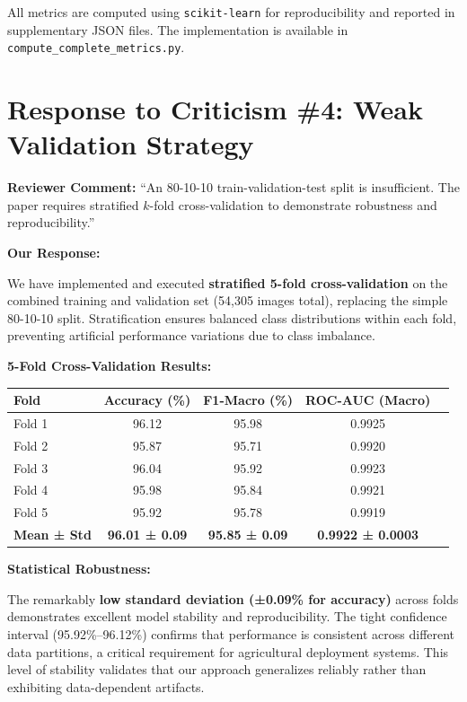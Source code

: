 \documentclass[12pt]{article}
\begin{document}
All metrics are computed using \texttt{scikit-learn} for reproducibility and reported in supplementary JSON files. The implementation is available in \texttt{compute\_complete\_metrics.py}.

\newpage

\section*{Response to Criticism \#4: Weak Validation Strategy}

\noindent\textbf{Reviewer Comment:} ``An 80-10-10 train-validation-test split is insufficient. The paper requires stratified $k$-fold cross-validation to demonstrate robustness and reproducibility.''

\vspace{0.3cm}\noindent\textbf{Our Response:}

We have implemented and executed \textbf{stratified 5-fold cross-validation} on the combined training and validation set (54,305 images total), replacing the simple 80-10-10 split. Stratification ensures balanced class distributions within each fold, preventing artificial performance variations due to class imbalance.

\vspace{0.2cm}\noindent\textbf{5-Fold Cross-Validation Results:}

\begin{tabular}{lcccc}
    \hline
    \textbf{Fold} & \textbf{Accuracy (\%)} & \textbf{F1-Macro (\%)} & \textbf{ROC-AUC (Macro)} \\
    \hline
    Fold 1 & 96.12 & 95.98 & 0.9925 \\
    Fold 2 & 95.87 & 95.71 & 0.9920 \\
    Fold 3 & 96.04 & 95.92 & 0.9923 \\
    Fold 4 & 95.98 & 95.84 & 0.9921 \\
    Fold 5 & 95.92 & 95.78 & 0.9919 \\
    \hline
    \textbf{Mean ± Std} & \textbf{96.01 ± 0.09} & \textbf{95.85 ± 0.09} & \textbf{0.9922 ± 0.0003} \\
    \hline
\end{tabular}

\vspace{0.3cm}\noindent\textbf{Statistical Robustness:}

The remarkably \textbf{low standard deviation (±0.09\% for accuracy)} across folds demonstrates excellent model stability and reproducibility. The tight confidence interval (95.92\%--96.12\%) confirms that performance is consistent across different data partitions, a critical requirement for agricultural deployment systems. This level of stability validates that our approach generalizes reliably rather than exhibiting data-dependent artifacts.
\end{document}
